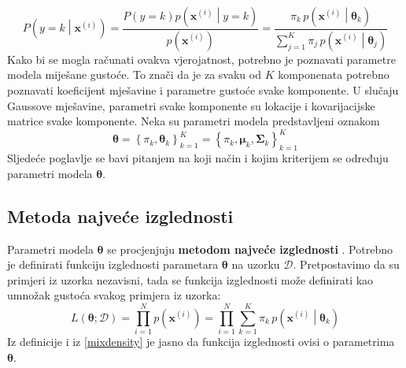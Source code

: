 \documentclass[times, utf8, zavrsni]{fer}
\begin{document}
\begin{equation}
\label{odgovornost}
P \left(y = k \middle| \mathbf{x}^{(i)}\right)
=
\frac
{P \left(y = k\right) p \left(\mathbf{x}^{(i)} \middle| y = k\right)}
{p \left(\mathbf{x}^{(i)}\right)}
=
\frac
{\pi_k \, p \left(\mathbf{x}^{(i)} \middle| \boldsymbol{\theta}_k\right)}
{\sum_{j=1}^{K} \pi_j \, p \left(\mathbf{x}^{(i)} \middle| \boldsymbol{\theta}_j\right)}
\end{equation}
Kako bi se mogla računati ovakva vjerojatnost, potrebno je poznavati parametre modela miješane gustoće. To znači da je za svaku od $K$ komponenata potrebno poznavati koeficijent mješavine i parametre gustoće svake komponente. U slučaju Gaussove mješavine, parametri svake komponente su lokacije i kovarijacijske matrice svake komponente. Neka su parametri modela predstavljeni oznakom
\[\boldsymbol{\theta} 
= \left\{ \pi_k, \boldsymbol{\theta}_k \right\}_{k=1}^{K}
= \left\{ \pi_k, \boldsymbol{\mu}_k, \boldsymbol{\Sigma}_k \right\}_{k=1}^{K}
\]
Sljedeće poglavlje se bavi pitanjem na koji način i kojim kriterijem se određuju parametri modela $\boldsymbol{\theta}$.

\subsection{Metoda najveće izglednosti}
Parametri modela $\boldsymbol{\theta}$ se procjenjuju \textbf{metodom najveće izglednosti} . Potrebno je definirati funkciju izglednosti parametara $\boldsymbol{\theta}$ na uzorku $\mathcal{D}$. Pretpostavimo da su primjeri iz uzorka nezavisni, tada se funkcija izglednosti može definirati kao umnožak gustoća svakog primjera iz uzorka:
\[L \left(\boldsymbol{\theta} ; \mathcal{D} \right)
= \prod_{i=1}^{N} p \left( \mathbf{x}^{(i)} \right)
= \prod_{i=1}^{N} 
\sum_{k=1}^{K} \pi_k \, p \left(\mathbf{x}^{(i)} \middle| \boldsymbol{\theta}_k\right)
\]
Iz definicije i iz \ref{mixdensity} je jasno da funkcija izglednosti ovisi o parametrima $\boldsymbol{\theta}$.
\end{document}
